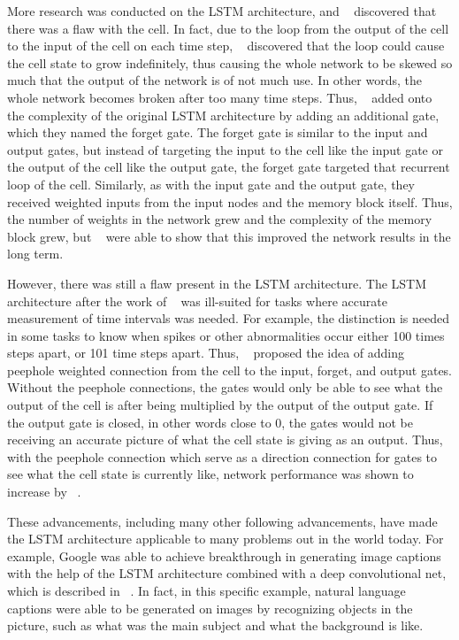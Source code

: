 \documentclass[11pt,letterpaper]{article}
\begin{document}
More research was conducted on the LSTM architecture, and ~\cite{Gers:99} discovered that there was a flaw with the cell. In fact, due to the loop from the output of the cell to the input of the cell on each time step, ~\cite{Gers:99} discovered that the loop could cause the cell state to grow indefinitely, thus causing the whole network to be skewed so much that the output of the network is of not much use. In other words, the whole network becomes broken after too many time steps. Thus, ~\cite{Gers:99} added onto the complexity of the original LSTM architecture by adding an additional gate, which they named the forget gate. The forget gate is similar to the input and output gates, but instead of targeting the input to the cell like the input gate or the output of the cell like the output gate, the forget gate targeted that recurrent loop of the cell. Similarly, as with the input gate and the output gate, they received weighted inputs from the input nodes and the memory block itself. Thus, the number of weights in the network grew and the complexity of the memory block grew, but ~\cite{Gers:99} were able to show that this improved the network results in the long term.

However, there was still a flaw present in the LSTM architecture. The LSTM architecture after the work of ~\cite{Gers:99} was ill-suited for tasks where accurate measurement of time intervals was needed. For example, the distinction is needed in some tasks to know when spikes or other abnormalities occur either 100 times steps apart, or 101 time steps apart. Thus, ~\cite{Gers:02} proposed the idea of adding peephole weighted connection from the cell to the input, forget, and output gates. Without the peephole connections, the gates would only be able to see what the output of the cell is after being multiplied by the output of the output gate. If the output gate is closed, in other words close to 0, the gates would not be receiving an accurate picture of what the cell state is giving as an output. Thus, with the peephole connection which serve as a direction connection for gates to see what the cell state is currently like, network performance was shown to increase by ~\cite{Gers:02}.

These advancements, including many other following advancements, have made the LSTM architecture applicable to many problems out in the world today. For example, Google was able to achieve breakthrough in generating image captions with the help of the LSTM architecture combined with a deep convolutional net, which is described in ~\cite{Vinyals:14}. In fact, in this specific example, natural language captions were able to be generated on images by recognizing objects in the picture, such as what was the main subject and what the background is like.
\end{document}
